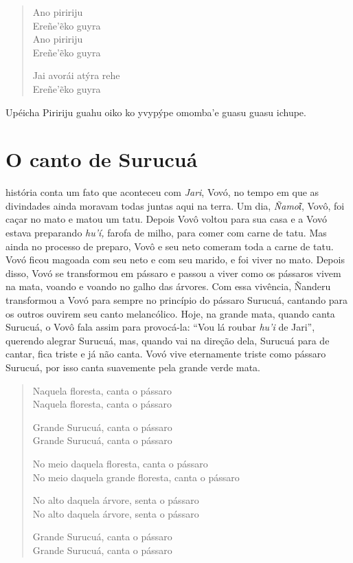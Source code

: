 \begin{verse}
Ano piririju\\
Ereñe'ẽko guyra\\
Ano piririju\\
Ereñe'ẽko guyra
       
Jai avorái atýra rehe\\
Ereñe'ẽko guyra
\end{verse}

Upéicha Piririju guahu oiko ko yvypýpe omomba'e guasu guasu ichupe.

\chapter{O canto de Surucuá}

 história conta um fato que aconteceu com \emph{Jari}, Vovó, no
tempo em que as divindades ainda moravam todas juntas aqui na terra. Um
dia, \emph{Ñamoῖ}, Vovô, foi caçar no mato e matou um tatu. Depois Vovô
voltou para sua casa e a Vovó estava preparando \emph{hu'í,} farofa de
milho, para comer com carne de tatu. Mas ainda no processo de preparo,
Vovô e seu neto comeram toda a carne de tatu. Vovó ficou magoada com seu
neto e com seu marido, e foi viver no mato. Depois disso, Vovó se
transformou em pássaro e passou a viver como os pássaros vivem na mata,
voando e voando no galho das árvores. Com essa vivência, Ñanderu
transformou a Vovó para sempre no princípio do pássaro Surucuá, cantando
para os outros ouvirem seu canto melancólico. Hoje, na grande mata,
quando canta Surucuá, o Vovô fala assim para provocá-la: ``Vou lá roubar
\emph{hu'i} de Jari'', querendo alegrar Surucuá, mas, quando vai na
direção dela, Surucuá para de cantar, fica triste e já não canta. Vovó
vive eternamente triste como pássaro Surucuá, por isso canta suavemente
pela grande verde mata.

\begin{verse}
Naquela floresta, canta o pássaro\\
Naquela floresta, canta o pássaro

Grande Surucuá, canta o pássaro\\
Grande Surucuá, canta o pássaro

No meio daquela floresta, canta o pássaro\\
No meio daquela grande floresta, canta o  pássaro

No alto daquela árvore, senta o pássaro\\
No alto daquela árvore, senta o pássaro

Grande Surucuá, canta o pássaro\\
Grande Surucuá, canta o pássaro
\end{verse}

